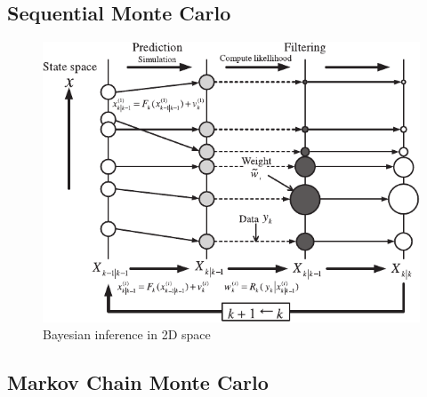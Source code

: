 \subsection{Sequential Monte Carlo}
\begin{figure}[htbp]
    \centering
    \includegraphics[width = 140mm]{Figures/figure-particle filter.pdf}
    \caption{Bayesian inference in 2D space}
    \label{fig: particle filter}
\end{figure}

\subsection{Markov Chain Monte Carlo}

